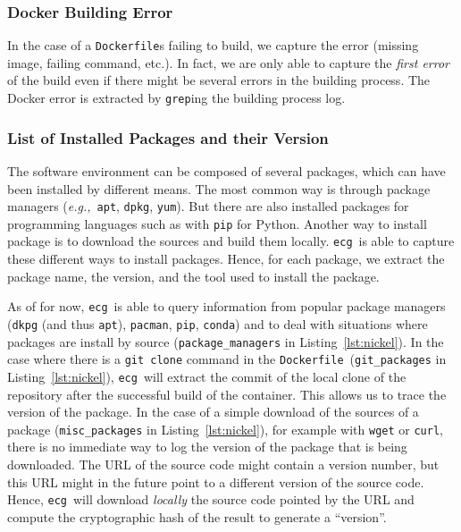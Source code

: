 \documentclass[sigconf,natbib=false]{acmart}
\newcommand{\eg}{\emph{e.g.,}}
\newcommand{\df}{\texttt{Dockerfile}}
\newcommand{\ecg}{\texttt{ecg}}
\begin{document}
\subsubsection{Docker Building Error}

In the case of a \df s failing to build, we capture the error (missing image, failing command, etc.).
In fact, we are only able to capture the \emph{first error} of the build even if there might be several errors in the building process.
The Docker error is extracted by \texttt{grep}ing the building process log.

\subsubsection{List of Installed Packages and their Version}

The software environment can be composed of several packages, which can have been installed by different means.
The most common way is through package managers (\eg\ \texttt{apt}, \texttt{dpkg}, \texttt{yum}).
But there are also installed packages for programming languages such as with \texttt{pip} for Python.
Another way to install package is to download the sources and build them locally.
\ecg\ is able to capture these different ways to install packages.
Hence, for each package, we extract the package name, the version, and the tool used to install the package.

As of for now, \ecg\ is able to query information from popular package managers (\texttt{dkpg} (and thus \texttt{apt}), \texttt{pacman}, \texttt{pip}, \texttt{conda}) and to deal with situations where packages are install by source (\texttt{package\_managers} in Listing~\ref{lst:nickel}).
In the case where there is a \texttt{git clone} command in the \df\ (\texttt{git\_packages} in Listing~\ref{lst:nickel}), \ecg\ will extract the commit of the local clone of the repository after the successful build of the container.
This allows us to trace the version of the package.
In the case of a simple download of the sources of a package (\texttt{misc\_packages} in Listing~\ref{lst:nickel}), for example with \texttt{wget} or \texttt{curl}, there is no immediate way to log the version of the package that is being downloaded.
The URL of the source code might contain a version number, but this URL might in the future point to a different version of the source code.
Hence, \ecg\ will download \emph{locally} the source code pointed by the URL and compute the cryptographic hash of the result to generate a ``version''.
\end{document}
